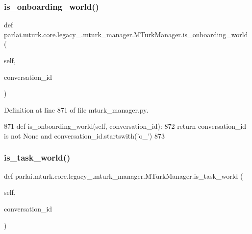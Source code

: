 \subsubsection{\texorpdfstring{is\+\_\+onboarding\+\_\+world()}{is\_onboarding\_world()}}
{\footnotesize\ttfamily def parlai.\+mturk.\+core.\+legacy\+\_.\+mturk\+\_\+manager.\+M\+Turk\+Manager.\+is\+\_\+onboarding\+\_\+world (\begin{DoxyParamCaption}\item[{}]{self,  }\item[{}]{conversation\+\_\+id }\end{DoxyParamCaption})}



Definition at line 871 of file mturk\+\_\+manager.\+py.


\begin{DoxyCode}
871     \textcolor{keyword}{def }is\_onboarding\_world(self, conversation\_id):
872         \textcolor{keywordflow}{return} conversation\_id \textcolor{keywordflow}{is} \textcolor{keywordflow}{not} \textcolor{keywordtype}{None} \textcolor{keywordflow}{and} conversation\_id.startswith(\textcolor{stringliteral}{'o\_'})
873 
\end{DoxyCode}
\mbox{\label{classparlai_1_1mturk_1_1core_1_1legacy__2018_1_1mturk__manager_1_1MTurkManager_ab4214705590809115b5c564c5e00c9d0}} 
\subsubsection{\texorpdfstring{is\+\_\+task\+\_\+world()}{is\_task\_world()}}
{\footnotesize\ttfamily def parlai.\+mturk.\+core.\+legacy\+\_.\+mturk\+\_\+manager.\+M\+Turk\+Manager.\+is\+\_\+task\+\_\+world (\begin{DoxyParamCaption}\item[{}]{self,  }\item[{}]{conversation\+\_\+id }\end{DoxyParamCaption})}



